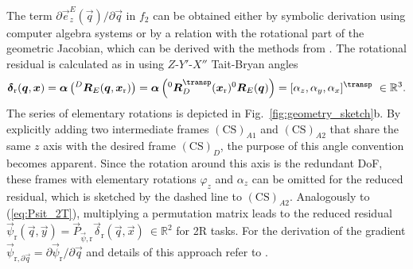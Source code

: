 \documentclass[graybox,vecphys]{svmult}
\newcommand{\rotmat}[2]{{{ }^{#1}\boldsymbol{R}}_{#2}}
\newcommand{\ks}[1]{{(\mathrm{CS})_{#1}}}
\newcommand{\Res}[0]{\vec{\delta}}
\newcommand{\ResR}[0]{\vec{\psi}}
\begin{document}
%
The term ${\partial{\vec{e}_{z}^E}(\vec{q})}/{\partial\vec{q}}$ in $f_\mathrm{2}$ can be obtained either by symbolic derivation using computer algebra systems or by a relation with the rotational part of the geometric Jacobian, which can be derived with the methods from \cite{SchapplerTapOrt2019a}. 
The rotational residual is calculated as in \cite{SchapplerTapOrt2019a} using $Z$-$Y'$-$X''$ Tait-Bryan angles
%
\vspace{-0.1cm}
\begin{equation}
\Res_{\mathrm{r}}(\vec{q},\vec{x})
=
\vec{\alpha}\left(\rotmat{D}{E}(\vec{q},\vec{x}_{\mathrm{r}})\right)
=
\vec{\alpha}\left(\rotmat{0}{D}^\transp (\vec{x}_{\mathrm{r}})\rotmat{0}{E}(\vec{q})\right)
=[\alpha_z,\alpha_y,\alpha_x]^\transp
~\in {\mathbb{R}^3}.
\vspace{-0.1cm}
\end{equation}
%
The series of elementary rotations is depicted in Fig.~\ref{fig:geometry_sketch}b.
By explicitly adding two intermediate frames $\ks{A1}$ and $\ks{A2}$ that share the same $z$ axis with the desired frame $\ks{D}$, the purpose of this angle convention becomes apparent. 
Since the rotation around this axis is the redundant DoF, these frames with elementary rotations $\varphi_z$ and $\alpha_z$ can be omitted for the reduced residual, which is sketched by the dashed line to $\ks{A2}$.
%
Analogously to (\ref{eq:Psit_2T}), multiplying a permutation matrix  leads to the reduced residual $\ResR_\mathrm{r}(\vec{q},\vec{y}) = \vec{P}_{\ResR,\mathrm{r}} \Res_{\mathrm{r}}(\vec{q},\vec{x})~\in {\mathbb{R}^2}$ for 2R tasks. 
For the derivation of the gradient $\ResR_{\mathrm{r},\partial \vec{q}}  = \partial \ResR_\mathrm{r} / \partial \vec{q}$ and details of this approach refer to \cite{SchapplerTapOrt2019a,SchapplerTapOrt2019}. 
\end{document}
